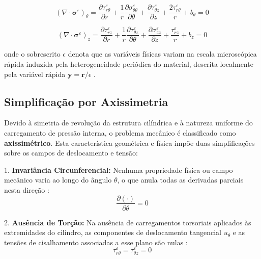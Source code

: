 \begin{equation}
  (\nabla \cdot \boldsymbol{\sigma}^\varepsilon)_\theta = \frac{\partial \tau_{r\theta}^\varepsilon}{\partial r} + \frac{1}{r} \frac{\partial \sigma_{\theta\theta}^\varepsilon}{\partial \theta} + \frac{\partial \tau_{\theta z}^\varepsilon}{\partial z} + \frac{2 \tau_{r\theta}^\varepsilon}{r} + b_\theta = 0
  \label{eq:equilibrium_3d_theta}
\end{equation}

\begin{equation}
  (\nabla \cdot \boldsymbol{\sigma}^\varepsilon)_z = \frac{\partial \tau_{rz}^\varepsilon}{\partial r} + \frac{1}{r} \frac{\partial \tau_{\theta z}^\varepsilon}{\partial \theta} + \frac{\partial \sigma_{zz}^\varepsilon}{\partial z} + \frac{\tau_{rz}^\varepsilon}{r} + b_z = 0
  \label{eq:equilibrium_3d_z}
\end{equation}


onde o sobrescrito $\epsilon$ denota que as variáveis físicas variam na escala microscópica rápida induzida pela heterogeneidade periódica do material, descrita localmente pela variável rápida $\mathbf{y} = \mathbf{r}/\epsilon$  \cite{bakhvalov1989}.


\subsection{Simplificação por Axissimetria}

Devido à simetria de revolução da estrutura cilíndrica e à natureza uniforme do carregamento de pressão interna, o problema mecânico é classificado como \textbf{axissimétrico}. Esta característica geométrica e física impõe duas simplificações sobre os campos de deslocamento e tensão:


1. \textbf{Invariância Circunferencial:} Nenhuma propriedade física ou campo mecânico varia ao longo do ângulo $\theta$, o que anula todas as derivadas parciais nesta direção \cite{Sadd2009}:
\begin{equation}
  \frac{\partial(\cdot)}{\partial \theta} = 0
  \label{eq:axisymmetry_deriv}
\end{equation}

2. \textbf{Ausência de Torção:} Na ausência de carregamentos torsoriais aplicados às extremidades do cilindro, as componentes de deslocamento tangencial $u_\theta$ e as tensões de cisalhamento associadas a esse plano são nulas \cite{Sadd2009}:
\begin{equation}
  \tau_{r\theta}^\varepsilon = \tau_{\theta z}^\varepsilon = 0
  \label{eq:axisymmetry_shear}
\end{equation}

